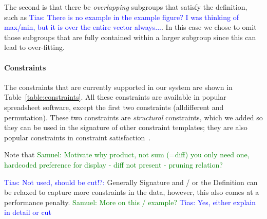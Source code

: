\documentclass{IEEEtran}
\newcommand{\sergey}[1]{\textcolor{magenta}{{\sc Sergey:} #1}\xspace}
\newcommand{\samuel}[1]{\textcolor{green}{{\sc Samuel:} #1}\xspace}
\newcommand{\tias}[1]{\textcolor{blue}{{\sc Tias:} #1}\xspace}
\newcommand{\CSignature}{Signature\xspace}
\newcommand{\CFunction}{Definition\xspace}
\theoremstyle{definition}
\begin{document}
The second is that there be \textit{overlapping} subgroups that satisfy the definition, such as \tias{There is no example in the example figure? I was thinking of max/min, but it is over the entire vector always...}.
In this case we chose to omit those subgroups that are fully contained within a larger subgroup since this can lead to over-fitting.

\paragraph{Constraints}
The constraints that are currently supported in our system are shown in Table~\ref{table:constraints}. All these constraints are available in popular spreadsheet software, except the first two constraints (alldifferent and permutation). These two constraints are \textit{structural} constraints, which we added so they can be used in the signature of other constraint templates; they are also popular constraints in constraint satisfaction~\cite{modelseeker}.


Note that \samuel{Motivate why product, not sum (=diff) you only need one, hardcoded preference for display - diff not present - pruning relation?}

\tias{Not used, should be cut!?:}
Generally \CSignature and / or the \CFunction can be relaxed to capture more constraints in the data, however, this also comes at a performance penalty. \samuel{More on this / example?} \tias{Yes, either explain in detail or cut}



\end{document}
